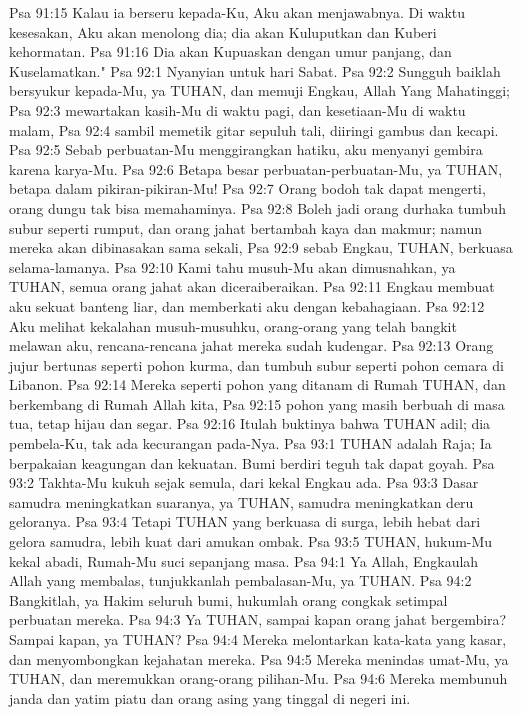Psa 91:15  Kalau ia berseru kepada-Ku, Aku akan menjawabnya. Di waktu kesesakan, Aku akan menolong dia; dia akan Kuluputkan dan Kuberi kehormatan.
Psa 91:16  Dia akan Kupuaskan dengan umur panjang, dan Kuselamatkan."
Psa 92:1  Nyanyian untuk hari Sabat.
Psa 92:2  Sungguh baiklah bersyukur kepada-Mu, ya TUHAN, dan memuji Engkau, Allah Yang Mahatinggi;
Psa 92:3  mewartakan kasih-Mu di waktu pagi, dan kesetiaan-Mu di waktu malam,
Psa 92:4  sambil memetik gitar sepuluh tali, diiringi gambus dan kecapi.
Psa 92:5  Sebab perbuatan-Mu menggirangkan hatiku, aku menyanyi gembira karena karya-Mu.
Psa 92:6  Betapa besar perbuatan-perbuatan-Mu, ya TUHAN, betapa dalam pikiran-pikiran-Mu!
Psa 92:7  Orang bodoh tak dapat mengerti, orang dungu tak bisa memahaminya.
Psa 92:8  Boleh jadi orang durhaka tumbuh subur seperti rumput, dan orang jahat bertambah kaya dan makmur; namun mereka akan dibinasakan sama sekali,
Psa 92:9  sebab Engkau, TUHAN, berkuasa selama-lamanya.
Psa 92:10  Kami tahu musuh-Mu akan dimusnahkan, ya TUHAN, semua orang jahat akan diceraiberaikan.
Psa 92:11  Engkau membuat aku sekuat banteng liar, dan memberkati aku dengan kebahagiaan.
Psa 92:12  Aku melihat kekalahan musuh-musuhku, orang-orang yang telah bangkit melawan aku, rencana-rencana jahat mereka sudah kudengar.
Psa 92:13  Orang jujur bertunas seperti pohon kurma, dan tumbuh subur seperti pohon cemara di Libanon.
Psa 92:14  Mereka seperti pohon yang ditanam di Rumah TUHAN, dan berkembang di Rumah Allah kita,
Psa 92:15  pohon yang masih berbuah di masa tua, tetap hijau dan segar.
Psa 92:16  Itulah buktinya bahwa TUHAN adil; dia pembela-Ku, tak ada kecurangan pada-Nya.
Psa 93:1  TUHAN adalah Raja; Ia berpakaian keagungan dan kekuatan. Bumi berdiri teguh tak dapat goyah.
Psa 93:2  Takhta-Mu kukuh sejak semula, dari kekal Engkau ada.
Psa 93:3  Dasar samudra meningkatkan suaranya, ya TUHAN, samudra meningkatkan deru geloranya.
Psa 93:4  Tetapi TUHAN yang berkuasa di surga, lebih hebat dari gelora samudra, lebih kuat dari amukan ombak.
Psa 93:5  TUHAN, hukum-Mu kekal abadi, Rumah-Mu suci sepanjang masa.
Psa 94:1  Ya Allah, Engkaulah Allah yang membalas, tunjukkanlah pembalasan-Mu, ya TUHAN.
Psa 94:2  Bangkitlah, ya Hakim seluruh bumi, hukumlah orang congkak setimpal perbuatan mereka.
Psa 94:3  Ya TUHAN, sampai kapan orang jahat bergembira? Sampai kapan, ya TUHAN?
Psa 94:4  Mereka melontarkan kata-kata yang kasar, dan menyombongkan kejahatan mereka.
Psa 94:5  Mereka menindas umat-Mu, ya TUHAN, dan meremukkan orang-orang pilihan-Mu.
Psa 94:6  Mereka membunuh janda dan yatim piatu dan orang asing yang tinggal di negeri ini.
